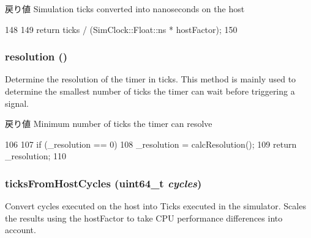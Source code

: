 \begin{DoxyReturn}{戻り値}
Simulation ticks converted into nanoseconds on the host 
\end{DoxyReturn}



\begin{DoxyCode}
148                                 {
149         return ticks / (SimClock::Float::ns * hostFactor);
150     }
\end{DoxyCode}
\hypertarget{classBaseKvmTimer_a4450cc644b16fe4cb8b25ed02fb6446f}{
\subsubsection[{resolution}]{ resolution ()}}
\label{classBaseKvmTimer_a4450cc644b16fe4cb8b25ed02fb6446f}
Determine the resolution of the timer in ticks. This method is mainly used to determine the smallest number of ticks the timer can wait before triggering a signal.

\begin{DoxyReturn}{戻り値}
Minimum number of ticks the timer can resolve 
\end{DoxyReturn}



\begin{DoxyCode}
106                       {
107         if (_resolution == 0)
108             _resolution = calcResolution();
109         return _resolution;
110     }
\end{DoxyCode}
\hypertarget{classBaseKvmTimer_ace36954bea0efa9977b9d4760437860b}{
\subsubsection[{ticksFromHostCycles}]{ ticksFromHostCycles (uint64\_\-t {\em cycles})}}
\label{classBaseKvmTimer_ace36954bea0efa9977b9d4760437860b}
Convert cycles executed on the host into Ticks executed in the simulator. Scales the results using the hostFactor to take CPU performance differences into account.

